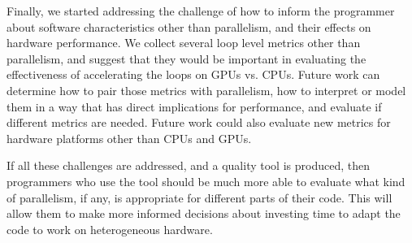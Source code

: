 \documentclass[12pt,twoside]{reedthesis}
\begin{document}
	Finally, we started addressing the challenge of how to inform the programmer about software characteristics other than parallelism, and their effects on hardware performance. We collect several loop level metrics other than parallelism, and suggest that they would be important in evaluating the effectiveness of accelerating the loops on GPUs vs. CPUs. 
	Future work can determine how to pair those metrics with parallelism, how to interpret or model them in a way that has direct implications for performance, and evaluate if different metrics are needed. Future work could also evaluate new metrics for hardware platforms other than CPUs and GPUs.
	
	If all these challenges are addressed, and a quality tool is produced, then programmers who use the tool should be much more able to evaluate what kind of parallelism, if any, is appropriate for different parts of their code. This will allow them to make more informed decisions about investing time to adapt the code to work on heterogeneous hardware. %
	
	
	




  \backmatter %

    \nocite{*}


%  
 

\end{document}
